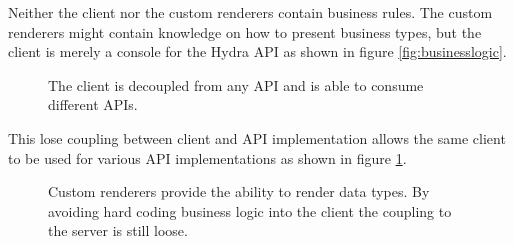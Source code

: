 Neither the client nor the custom renderers contain business rules. The custom renderers might contain knowledge on how to present business types, but the client is merely a \gls{console} for the Hydra API as shown in figure \ref{fig:businesslogic}.

\begin{figure}[!htb]
  \caption{The client is decoupled from any API and is able to consume different APIs.}
  \label{fig:losecoupling}
\end{figure}

This lose coupling between client and API implementation allows the same client to be used for various API implementations as shown in figure \ref{fig:losecoupling}.

\begin{figure}[!htb]
  \caption{Custom renderers provide the ability to render data types. By avoiding hard coding business logic into the client the coupling to the server is still loose.}
  \label{fig:linkeddata}
\end{figure}


